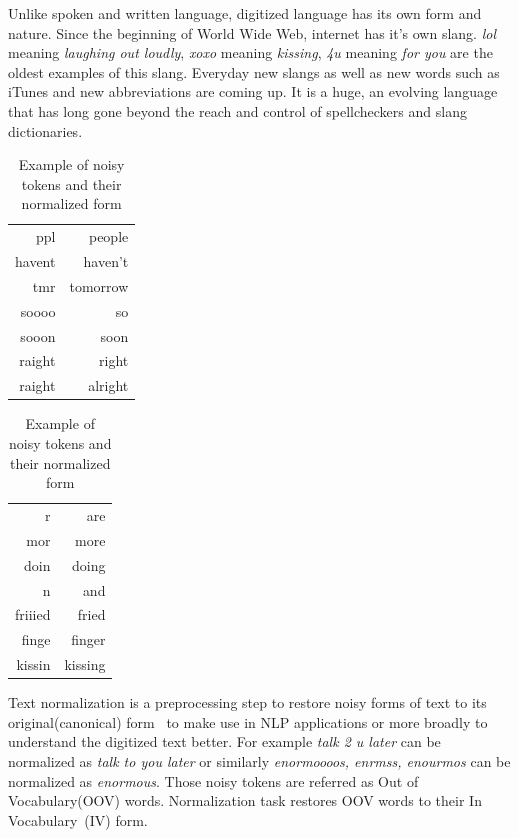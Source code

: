 \documentclass[preprint,review,12pt]{elsarticle}
\begin{document}
Unlike spoken and written language, digitized language has its own form and nature. Since the beginning of World Wide Web, internet has it's own slang. \textit{lol} meaning \textit{laughing out loudly},  \textit{xoxo} meaning \textit{kissing}, \textit{4u} meaning \textit{for you} are the oldest examples of this slang. Everyday new slangs as well as new words such as iTunes and new abbreviations are coming up. It is a huge, an evolving language that has long gone beyond the reach and control of spellcheckers and slang dictionaries.
\begin{table}[tbhp]
\begin{minipage}[c]{.5\linewidth}
\centering
\begin{tabular}[h]{|r|r|}
\hline
ppl & people \\
havent & haven't \\
tmr &   tomorrow \\
soooo &  so \\
sooon &  soon \\
raight & right \\
raight & alright \\
\hline
\end{tabular}
\end{minipage}
\begin{minipage}[c]{.5\linewidth}
\centering
\begin{tabular}[h]{|r|r|}
\hline
r  &  are \\
mor &    more \\
doin &   doing \\
n &      and \\
friiied &  fried \\
finge &  finger \\
kissin & kissing \\
\hline
\end{tabular}
\end{minipage}
\caption{Example of noisy tokens and their normalized form}
\label{tab:normalizations}
\end{table}

Text normalization is a preprocessing step to restore noisy forms of text to its original(canonical) form~\cite{Han:2011:LNS:2002472.2002520} to make use in NLP applications or more broadly to understand the digitized text better. For example \textit{talk 2 u later} can be normalized as \textit{talk to you later} or similarly \textit{enormoooos, enrmss, enourmos} can be normalized as \textit{enormous}. Those noisy tokens are referred as Out of Vocabulary(OOV) words. Normalization task restores OOV words to their In Vocabulary~(IV) form.
\end{document}
